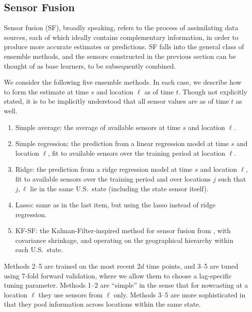 \documentclass[sts]{imsart}
\theoremstyle{plain}
\theoremstyle{definition}
\theoremstyle{remark}
\begin{document}
\subsection{Sensor Fusion}
\label{sec:sensor_fusion}

Sensor fusion (SF), broadly speaking, refers to the process of assimilating  
data sources, each of which ideally contains complementary information, in order
to produce more accurate estimates or predictions. SF falls into the general 
class of ensemble methods, and the sensors constructed in the previous section
can be thought of as base learners, to be subsequently combined.

We consider the following five ensemble methods. In each case, we describe how
to form the estimate at time $s$ and location $\ell$ as of time $t$. Though not
explicitly stated, it is to be implicitly understood that all sensor values are
as of time $t$ as well. 

\begin{enumerate}
\item Simple average: the average of available sensors at time $s$ and location 
  $\ell$. 
\item Simple regression: the prediction from a linear regression model at time
  $s$ and location $\ell$, fit to available sensors over the training period at
  location $\ell$. 
\item Ridge: the prediction from a ridge regression model at time $s$ and
  location $\ell$, fit to available sensors over the training period and over
  locations $j$ such that $j,\ell$ lie in the same U.S.\ state (including the
  state sensor itself).   
\item Lasso: same as in the last item, but using the lasso instead of ridge
  regression. 
\item KF-SF: the Kalman-Filter-inspired method for sensor fusion from
  \citet{Farrow:2016, Jahja:2019}, with covariance shrinkage, and
  operating on the geographical hierarchy within each U.S.\ state. 
\end{enumerate}
Methods 2--5 are trained on the most recent $2d$ time points, and 3--5 are tuned
using 7-fold forward validation, where we allow them to choose a lag-specific
tuning parameter. Methods 1--2 are ``simple'' in the sense that for nowcasting
at a location $\ell$ they use sensors from $\ell$ only. Methods 3--5 are more
sophisticated in that they pool information across locations within the same
state. %
\end{document}
